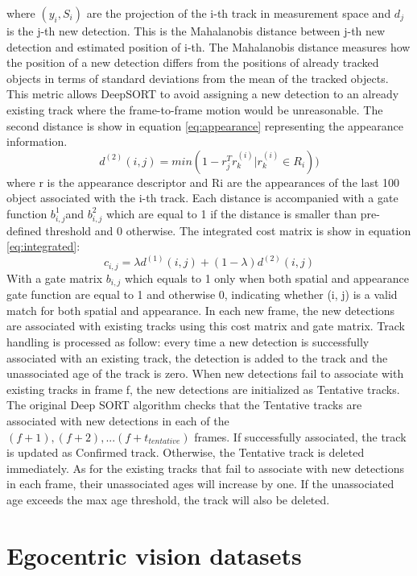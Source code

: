 where \((y_i, S_i)\) are the projection of the i-th track in measurement space and \(d_j\) is the j-th new detection. This is the Mahalanobis distance \cite{hastie2009elements} between j-th new detection and estimated position of i-th. The Mahalanobis distance measures how the position of a new detection differs from the positions of already tracked objects in terms of standard deviations from the mean of the tracked objects. This metric allows DeepSORT to avoid assigning a new detection to an already existing track where the frame-to-frame motion would be unreasonable. The second distance is show in equation \ref{eq:appearance} representing the appearance information.
\begin{equation}
	\label{eq:appearance}
	d^{(2)}(i,j)=min(1-r_j^Tr_k^{(i)}|r_k^{(i)}\in R_i))
\end{equation}
where r is the appearance descriptor and Ri are the appearances of the last 100 object associated with the i-th track. Each distance is accompanied with a gate function \(b_{i,j}^1\)and \(b_{i,j}^2\) which are equal to 1 if the distance is smaller than pre-defined threshold and 0 otherwise. The integrated cost matrix is show in equation \ref{eq:integrated}:
\begin{equation}
	\label{eq:integrated}
	c_{i,j} = \lambda d^{(1)}(i,j) + (1-\lambda)d^{(2)}(i,j)
\end{equation}
With a gate matrix \(b_{i,j}\) which equals to 1 only when both spatial and appearance gate function are equal to 1 and otherwise 0, indicating whether (i, j) is a valid match for both spatial and appearance. In each new frame, the new detections are associated with existing tracks using this cost matrix and gate matrix.
Track handling is processed as follow: every time a new detection is successfully associated with an existing track, the detection is added to the track and the unassociated age of the track is zero. When new detections fail to associate with existing tracks in frame f, the new detections are initialized as Tentative tracks. The original Deep SORT algorithm checks that the Tentative tracks are associated with new detections in each of the  \((f+1), (f+2), ... (f+t_{tentative})\) frames. If successfully associated, the track is updated as Confirmed track. Otherwise, the Tentative track is deleted immediately. As for the existing tracks that fail to associate with new detections in each frame, their unassociated ages will increase by one. If the unassociated age exceeds the max age threshold, the track will also be deleted.
\section{Egocentric vision datasets}\label{sec:datasets}
